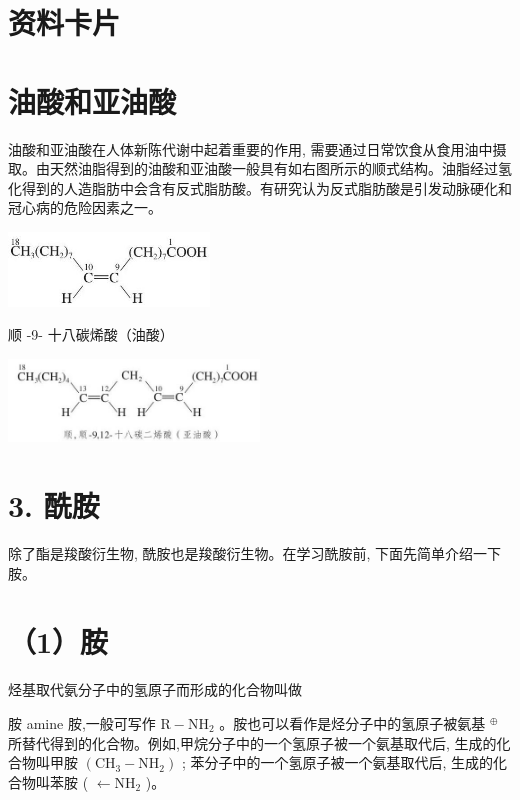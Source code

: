 \documentclass[10pt]{article}
\begin{document}
\section*{资料卡片}

\section*{油酸和亚油酸}

油酸和亚油酸在人体新陈代谢中起着重要的作用, 需要通过日常饮食从食用油中摄取。由天然油脂得到的油酸和亚油酸一般具有如右图所示的顺式结构。油脂经过氢化得到的人造脂肪中会含有反式脂肪酸。有研究认为反式脂肪酸是引发动脉硬化和冠心病的危险因素之一。

\begin{center}
\includegraphics[max width=0.4\textwidth]{images/0190efc5-b58a-7c43-bfb0-e0a030df9cfd_85_680074.jpg}
\end{center}

顺 -9- 十八碳烯酸（油酸）

\begin{center}
\includegraphics[max width=0.5\textwidth]{images/0190efc5-b58a-7c43-bfb0-e0a030df9cfd_85_530507.jpg}
\end{center}

\section*{3. 酰胺}

除了酯是羧酸衍生物, 酰胺也是羧酸衍生物。在学习酰胺前, 下面先简单介绍一下胺。

\section*{（1）胺}

烃基取代氨分子中的氢原子而形成的化合物叫做

胺 amine 胺,一般可写作 \(\mathrm{R} - {\mathrm{{NH}}}_{2}\) 。胺也可以看作是烃分子中的氢原子被氨基 \({}^{ \oplus }\) 所替代得到的化合物。例如,甲烷分子中的一个氢原子被一个氨基取代后, 生成的化合物叫甲胺 \(\left( {{\mathrm{{CH}}}_{3} - {\mathrm{{NH}}}_{2}}\right)\) ; 苯分子中的一个氢原子被一个氨基取代后, 生成的化合物叫苯胺 ( \(\leftarrow {\mathrm{{NH}}}_{2}\) )。
\end{document}
